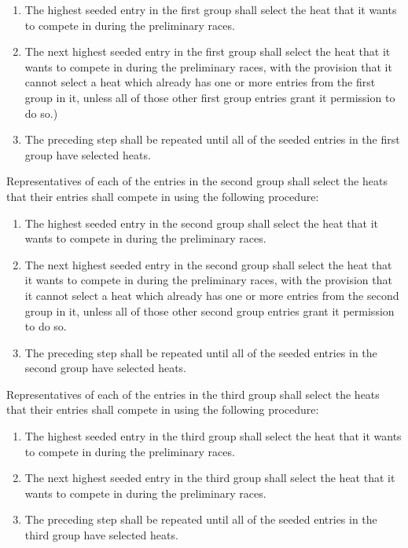 	\begin{enumerate}

		\item
		The highest seeded entry in the first group shall select the heat that it
		wants to compete in during the preliminary races. 

		\item
		The next highest seeded entry in the first group shall select the heat that
		it wants to compete in during the preliminary races, with the provision that it
		cannot select a heat which already has one or more entries from the first group
		in it, unless all of those other first group entries grant it permission to do
		so.) 
		
		\item
		The preceding step shall be repeated until all of the seeded entries in the
		first group have selected heats.

	\end{enumerate}

	Representatives of each of the entries in the second group shall select the
	heats that their entries shall compete in using the following procedure:

	\begin{enumerate}

		\item
		The highest seeded entry in the second group shall select the heat that it
		wants to compete in during the preliminary races. 

		\item
		The next highest seeded entry in the second group shall select the heat that
		it wants to compete in during the preliminary races, with the provision that it
		cannot select a heat which already has one or more entries from the second
		group in it, unless all of those other second group entries grant it permission
		to do so. 

		\item
		The preceding step shall be repeated until all of the seeded entries in the
		second group have selected heats.

	\end{enumerate}

	Representatives of each of the entries in the third group shall select the
	heats that their entries shall compete in using the following procedure:

	\begin{enumerate}

		\item
		The highest seeded entry in the third group shall select the heat that it wants
		to compete in during the preliminary races.

		\item
		The next highest seeded entry in the third group shall select the heat that it
		wants to compete in during the preliminary races.

		\item
		The preceding step shall be repeated until all of the seeded entries in the
		third group have selected heats.

	\end{enumerate}

